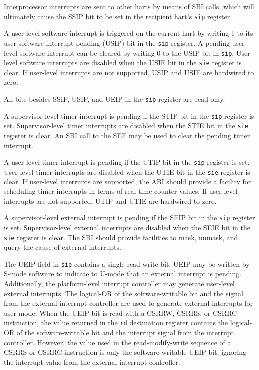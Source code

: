 Interprocessor interrupts are sent to other harts by means of SBI
calls, which will ultimately cause the SSIP bit to be set in the
recipient hart's {\tt sip} register.

A user-level software interrupt is triggered on the current hart by writing
1 to its user software interrupt-pending (USIP) bit in the {\tt sip} register.
A pending user-level software interrupt can be cleared by writing 0 to the
USIP bit in {\tt sip}.  User-level software interrupts are disabled when the
USIE bit in the {\tt sie} register is clear.  If user-level interrupts are not
supported, USIP and USIE are hardwired to zero.

All bits besides SSIP, USIP, and UEIP in the {\tt sip} register are read-only.

A supervisor-level timer interrupt is pending if the STIP bit in the {\tt sip}
register is set.  Supervisor-level timer interrupts are disabled when the STIE
bit in the {\tt sie} register is clear.  An SBI call to the SEE may be used to
clear the pending timer interrupt.

A user-level timer interrupt is pending if the UTIP bit in the {\tt sip}
register is set.  User-level timer interrupts are disabled when the UTIE bit
in the {\tt sie} register is clear.  If user-level interrupts are supported,
the ABI should provide a facility for scheduling timer interrupts in terms of
real-time counter values.  If user-level interrupts are not supported, UTIP
and UTIE are hardwired to zero.

A supervisor-level external interrupt is pending if the SEIP bit in the
{\tt sip} register is set.  Supervisor-level external interrupts are disabled
when the SEIE bit in the {\tt sie} register is clear.  The SBI should provide
facilities to mask, unmask, and query the cause of external interrupts.

The UEIP field in {\tt sip} contains a single read-write bit.  UEIP
may be written by S-mode software to indicate to U-mode that an
external interrupt is pending.  Additionally, the platform-level
interrupt controller may generate user-level external interrupts.  The
logical-OR of the software-writable bit and the signal from the
external interrupt controller are used to generate external interrupts
for user mode.  When the UEIP bit is read with a CSRRW, CSRRS, or
CSRRC instruction, the value returned in the {\tt rd} destination
register contains the logical-OR of the software-writable bit and the
interrupt signal from the interrupt controller.  However, the value
used in the read-modify-write sequence of a CSRRS or CSRRC instruction
is only the software-writable UEIP bit, ignoring the interrupt value
from the external interrupt controller.

